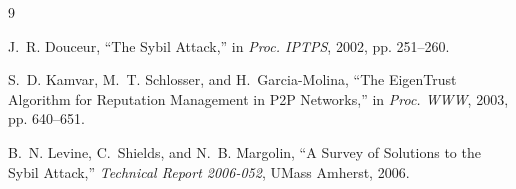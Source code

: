 \documentclass[11pt]{article}
\begin{document}
\begin{thebibliography}{9}

J.~R. Douceur, ``The Sybil Attack,'' in \emph{Proc. IPTPS}, 2002, pp. 251--260.

S.~D. Kamvar, M.~T. Schlosser, and H.~Garcia-Molina, ``The EigenTrust Algorithm for Reputation Management in P2P Networks,'' in \emph{Proc. WWW}, 2003, pp. 640--651.

B.~N. Levine, C.~Shields, and N.~B. Margolin, ``A Survey of Solutions to the Sybil Attack,'' \emph{Technical Report 2006-052}, UMass Amherst, 2006.

\end{thebibliography}
\end{document}
